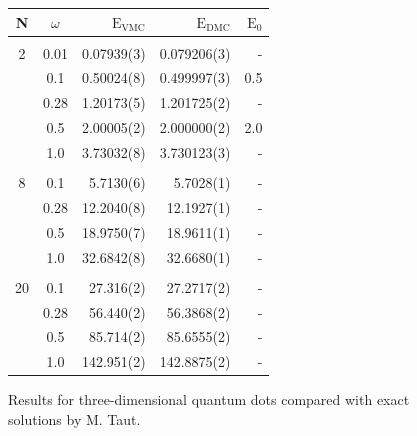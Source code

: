\begin{frame}

\footnotesize
\begin{figure}
 \begin{center}
 \begin{tabular}{cc|rrr}
    N     & $\omega$ & $\mathrm{E_{VMC}}$ & $\mathrm{E_{DMC}}$ & $\mathrm{E_0}$\\
\hline\hline
\multicolumn{5}{c}{} \\
    2     &   0.01   & 0.07939(3)  & 0.079206(3) & -		\\
          &   0.1    & 0.50024(8)  & 0.499997(3) & 0.5        \\
          &   0.28   & 1.20173(5)  & 1.201725(2) & -		\\
          &   0.5    & 2.00005(2)  & 2.000000(2) & 2.0 \\
          &   1.0    & 3.73032(8)  & 3.730123(3) & - \\
\cline{2-5}
\multicolumn{5}{c}{} \\
    8     &   0.1    & 5.7130(6)   & 5.7028(1)   & - 		\\
          &   0.28   & 12.2040(8)  & 12.1927(1)  & -		\\
          &   0.5    & 18.9750(7)  & 18.9611(1)  & -\\
          &   1.0    & 32.6842(8)  & 32.6680(1)  & -\\
\cline{2-5}
\multicolumn{5}{c}{} \\
    20    &   0.1    & 27.316(2)   & 27.2717(2)   & - 		\\
          &   0.28   & 56.440(2)   & 56.3868(2)   & -		\\
          &   0.5    & 85.714(2)   & 85.6555(2)   & - \\
          &   1.0    & 142.951(2)  & 142.8875(2)  & -
 \end{tabular}  
 \end{center}
  \caption{Results for three-dimensional quantum dots compared with exact solutions by M. Taut.}
\end{figure}
\end{frame}

\normalsize


